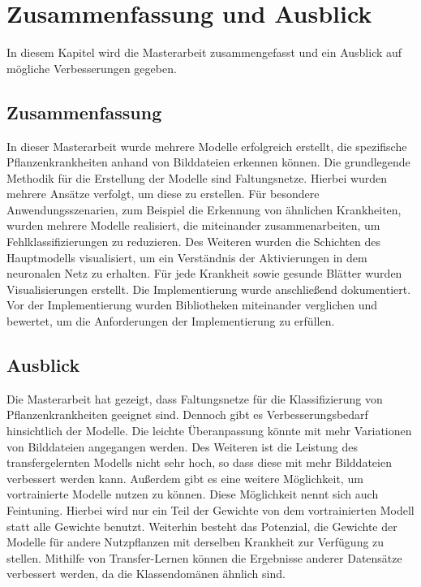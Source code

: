\chapter{Zusammenfassung und Ausblick}
\label{chapter:fazit}

In diesem Kapitel wird die Masterarbeit zusammengefasst und ein Ausblick auf mögliche
Verbesserungen gegeben.

\section{Zusammenfassung}
In dieser Masterarbeit wurde mehrere Modelle erfolgreich erstellt, die spezifische Pflanzenkrankheiten anhand von Bilddateien erkennen können. Die grundlegende Methodik für die Erstellung der Modelle sind Faltungsnetze. Hierbei wurden mehrere Ansätze verfolgt, um diese zu erstellen. Für besondere Anwendungsszenarien, zum Beispiel die Erkennung von ähnlichen Krankheiten, wurden mehrere Modelle realisiert, die miteinander zusammenarbeiten, um Fehlklassifizierungen zu reduzieren. Des Weiteren wurden die Schichten des Hauptmodells visualisiert, um ein Verständnis der Aktivierungen in dem neuronalen Netz zu erhalten. Für jede Krankheit sowie gesunde Blätter wurden Visualisierungen erstellt. Die Implementierung wurde anschließend dokumentiert. Vor der Implementierung wurden Bibliotheken miteinander verglichen und bewertet, um die Anforderungen der Implementierung zu erfüllen.

\section{Ausblick}
Die Masterarbeit hat gezeigt, dass Faltungsnetze für die Klassifizierung von Pflanzenkrankheiten geeignet sind. Dennoch gibt es Verbesserungsbedarf hinsichtlich der Modelle. Die leichte Überanpassung könnte mit mehr Variationen von Bilddateien angegangen werden. Des Weiteren ist die Leistung des transfergelernten Modells nicht sehr hoch, so dass diese mit mehr Bilddateien verbessert werden kann. Außerdem gibt es eine weitere Möglichkeit, um vortrainierte Modelle nutzen zu können. Diese Möglichkeit nennt sich auch Feintuning. Hierbei wird nur ein Teil der Gewichte von dem vortrainierten Modell statt alle Gewichte benutzt. Weiterhin besteht das Potenzial, die Gewichte der Modelle für andere Nutzpflanzen mit derselben Krankheit zur Verfügung zu stellen. Mithilfe von Transfer-Lernen können die Ergebnisse anderer Datensätze verbessert werden, da die Klassendomänen ähnlich sind. 


